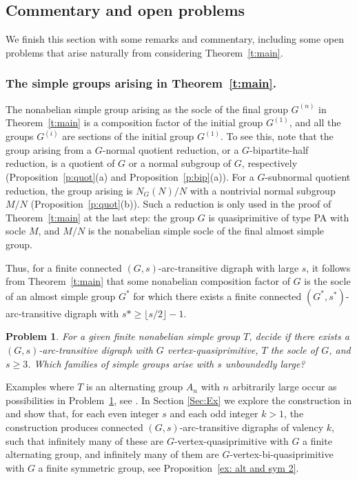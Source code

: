 \documentclass[11pt]{amsart}
\newtheorem{problem}{Problem}
\begin{document}
\subsection{Commentary and open problems}

We finish this section with some remarks and commentary, including some open problems that arise naturally from considering Theorem~\ref{t:main}. 

\subsubsection{The simple groups arising in Theorem~\ref{t:main}.}\label{s:simple}
The nonabelian simple group arising as the socle of the final group $G^{(n)}$ in Theorem~\ref{t:main} is a composition factor of the initial group $G^{(1)}$, and all the groups $G^{(i)}$ are sections of the initial group $G^{(1)}$. To see this, note that the group arising from a $G$-normal quotient reduction, or a $G$-bipartite-half reduction, is a quotient of $G$ or a normal subgroup of $G$, respectively (Proposition~\ref{p:quot}(a) and Proposition~\ref{p:bip}(a)). For a $G$-subnormal quotient reduction, the group arising is $N_G(N)/N$ with a nontrivial normal subgroup $M/N$ (Proposition~\ref{p:quot}(b)). Such a reduction is only used in the proof of Theorem~\ref{t:main} at the last step: the group $G$ is quasiprimitive of type PA with socle $M$, and $M/N$ is the nonabelian simple socle of the final almost simple group.    

Thus, for a finite connected $(G,s)$-arc-transitive digraph with large $s$, it follows from Theorem~\ref{t:main} that some nonabelian composition factor of $G$ is the socle of an almost simple group $G^*$ for which there exists a finite connected $(G^*,s^*)$-arc-transitive digraph with $s*\geqslant \lfloor s/2\rfloor -1$. %

\begin{problem}\label{p1}
    For a given finite nonabelian simple group $T$, decide if there exists a $(G,s)$-arc-transitive digraph with $G$ vertex-quasiprimitive, $T$ the socle of $G$, and $s\geqslant3$. Which families of simple groups arise with $s$ unboundedly large?
\end{problem}



Examples where $T$ is an alternating group $A_n$ with $n$ arbitrarily large occur as possibilities in Problem~\ref{p1}, see \cite[pp 66--67]{CLP}. In Section \ref{Sec:Ex} we explore the construction in \cite{CLP} and show that, for each even integer $s$ and each odd integer $k>1$, the construction produces  connected $(G,s)$-arc-transitive digraphs of valency $k$, such that infinitely many of these are $G$-vertex-quasiprimitive with $G$ a finite alternating group, and infinitely many of them are $G$-vertex-bi-quasiprimitive with $G$ a finite symmetric group, see Proposition~\ref{ex: alt and sym 2}.
\end{document}
